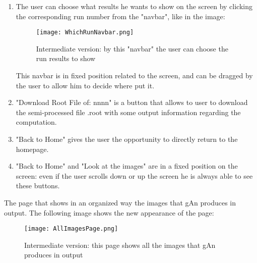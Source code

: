 \begin{enumerate}
\item The user can choose what results he wants to show on the screen by clicking the corresponding run number from the "navbar", like in the image:

\begin{figure}[H]
\centering
\texttt{[image: WhichRunNavbar.png]} 
\caption{Intermediate version: by this "navbar" the user can choose the run results to show}
\end{figure}

This navbar is in fixed position related to the screen, and can be dragged by the user to allow him to decide where put it.

\item "Download Root File of: nnnn" is a button that allows to user to download the semi-processed file .root with some output information regarding the computation.

\item "Back to Home" gives the user the opportunity to directly return to the homepage. 

\item "Back to Home" and "Look at the images" are in a fixed position on the screen: even if the user scrolls down or up the screen he is always able to see these buttons.    

\end{enumerate}
The page that shows in an organized way the images that gAn produces in output. The following image shows the new appearance of the page:



\begin{figure}[H]
\centering
\texttt{[image: AllImagesPage.png]} 
\caption{Intermediate version: this page shows all the images that gAn produces in output}
\end{figure}


